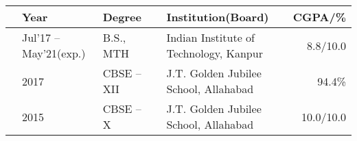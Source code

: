 
\newcommand{\education}[4]{
  & #1 & #2 & &#3 & #4
}
\begin{center}
\begin{tabular}{ | L{0.05cm} l | L{3cm} | L{0.05cm} C{8cm} | r |}
  \hline
  \education{\textbf{Year}}{\textbf{Degree}}{\textbf{Institution(Board)}}{\textbf{CGPA/\%}}\\
  \hline
  \education{Jul'17 -- May'21(exp.)}{B.S., MTH}{Indian Institute of Technology, Kanpur}{8.8/10.0}\\
  \education{2017}{CBSE -- XII}{J.T. Golden Jubilee School, Allahabad}{94.4\%}\\
  \education{2015}{CBSE -- X}{J.T. Golden Jubilee School, Allahabad}{10.0/10.0}\\
  \hline
\end{tabular}
\end{center}
\vspace{-4mm}
